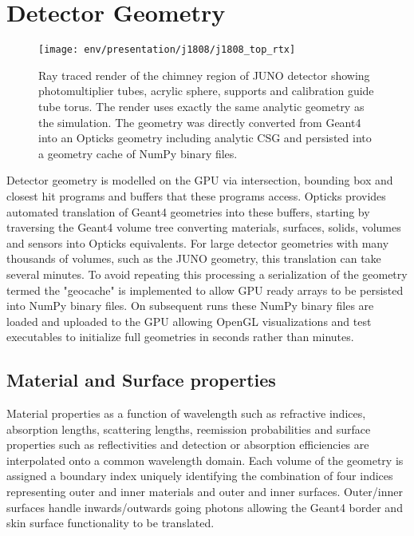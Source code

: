 \documentclass{webofc}
\begin{document}
\section{Detector Geometry} 
%
%
\begin{figure}
\centering
\texttt{[image: env/presentation/j1808/j1808\_top\_rtx]}
\caption{Ray traced render of the chimney region of JUNO detector showing photomultiplier tubes, acrylic sphere, supports and calibration guide tube torus. 
The render uses exactly the same analytic geometry as the simulation.
The geometry was directly converted from Geant4 into an Opticks geometry including analytic CSG 
and persisted into a geometry cache of NumPy\cite{numpy} binary files. 
}
\label{j1808} 
\end{figure}
%
%
Detector geometry is modelled on the GPU via intersection, bounding box 
and closest hit programs and buffers that these programs access.
Opticks provides automated translation of Geant4 geometries into these buffers, starting 
by traversing the Geant4 volume tree converting materials, surfaces, solids, volumes and sensors 
into Opticks equivalents. 
%
%
For large detector geometries with many thousands of volumes, such as the JUNO geometry, 
this translation can take several minutes. To avoid repeating this processing a serialization 
of the geometry termed the "geocache" is implemented to allow GPU ready arrays to be persisted into NumPy\cite{numpy} binary files.
On subsequent runs these NumPy binary files are loaded and uploaded to the GPU allowing OpenGL visualizations 
and test executables to initialize full geometries in seconds rather than minutes.
%
\subsection{Material and Surface properties} 

Material properties as a function of wavelength such as refractive indices, absorption lengths, scattering lengths, reemission probabilities
and surface properties such as reflectivities and detection or absorption efficiencies are interpolated 
onto a common wavelength domain.
Each volume of the geometry is assigned a boundary index uniquely identifying the combination of four indices representing 
outer and inner materials and outer and inner surfaces. Outer/inner surfaces handle inwards/outwards going photons allowing the Geant4 border and skin
surface functionality to be translated. 
\end{document}
